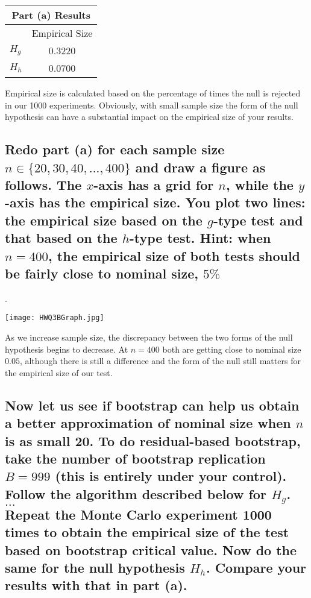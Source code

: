\documentclass[11pt]{article}
\theoremstyle{definition}
\begin{document}
\begin{center}
\begin{tabular}{l c}
\hline\hline
\multicolumn{2}{c}{\textbf{Part (a) Results}} \\
\hline\hline 
 & Empirical Size  \\
$H_{g}$ & 0.3220 \\
$H_{h}$ & 0.0700 \\
\hline\hline
\end{tabular} 
\end{center} 

\noindent
Empirical size is calculated based on the percentage of times the null is rejected in our 1000 experiments.  Obviously, with small sample size the form of the null hypothesis can have a substantial impact on the empirical size of your results.  

\subsection{Redo part (a) for each sample size $n \in \{20, 30, 40, \hdots, 400\}$ and draw a figure as follows.  The $x$-axis has a grid for $n$, while the $y$-axis has the empirical size.  You plot two lines: the empirical size based on the $g$-type test and that based on the $h$-type test.  Hint: when $n=400$, the empirical size of both tests should be fairly close to nominal size, $5\%$}.

\begin{center}
\texttt{[image: HWQ3BGraph.jpg]}
\end{center}

\noindent
As we increase sample size, the discrepancy between the two forms of the null hypothesis begins to decrease.  At $n=400$ both are getting close to nominal size $0.05$, although there is still a difference and the form of the null still matters for the empirical size of our test.

\subsection{Now let us see if bootstrap can help us obtain a better approximation of nominal size when $n$ is as small 20.  To do residual-based bootstrap, take the number of bootstrap replication $B=999$ (this is entirely under your control).  Follow the algorithm described below for $H_{g}$. \\ $\hdots$ \\ Repeat the Monte Carlo experiment 1000 times to obtain the empirical size of the test based on bootstrap critical value.  Now do the same for the null hypothesis $H_{h}$.  Compare your results with that in part (a).}
\end{document}
